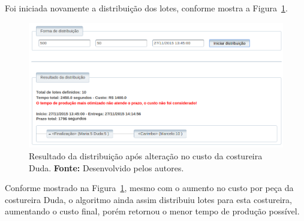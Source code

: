 \par Foi iniciada novamente a distribuição dos lotes, conforme mostra a
Figura~\ref{fig:resultado2_teste6}.



\begin{figure}[h!]
	\centerline{\includegraphics[width=14.7cm]{./imagens/resultado2_teste6.png}}
	\caption[Resultado da distribuição após alteração no custo da costureira Duda.] 
	{Resultado da distribuição após alteração no custo da costureira Duda. \textbf{Fonte:} Desenvolvido pelos
	autores.}
	\label{fig:resultado2_teste6}
\end{figure}

\par Conforme mostrado na Figura~\ref{fig:resultado2_teste6}, mesmo com o
aumento no custo por peça da costureira Duda, o algoritmo ainda assim distribuiu
lotes para esta costureira, aumentando o custo final, porém retornou o
menor tempo de produção possível.
